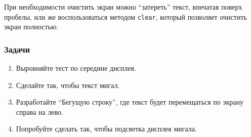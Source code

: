 \documentclass[../sparc.tex]{subfiles}
\begin{document}
При необходимости очистить экран можно ``затереть'' текст, впечатав поверх
пробелы, или же воспользоваться методом \texttt{clear}, который позволяет
очистить экран полностью.

\subsubsection{Задачи}
\begin{enumerate}
\item Выровняйте тест по середине дисплея.
\item Сделайте так, чтобы текст мигал.
\item Разработайте ``Бегущую строку'', где текст будет перемещаться по экрану
  справа на лево.
\item Попробуйте сделать так, чтобы подсветка дисплея мигала.
\end{enumerate}
\end{document}
